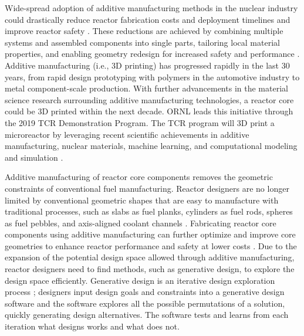 Wide-spread adoption of additive manufacturing methods in the nuclear industry 
could drastically reduce reactor fabrication costs and deployment timelines 
and improve reactor safety \cite{simpson_considerations_2019}. 
These reductions are achieved by combining multiple systems and assembled 
components into single parts, tailoring local material properties, and 
enabling geometry redesign for increased safety and performance 
\cite{simpson_considerations_2019}. 
Additive manufacturing (i.e., 3D printing) has progressed rapidly in the last 
30 years, from rapid design prototyping with polymers in the automotive industry 
to metal component-scale production. 
With further advancements in the material science research surrounding 
additive manufacturing technologies, a reactor core could be 3D printed within the 
next decade. 
\gls{ORNL} leads this initiative through the 2019 \gls{TCR} Demonstration Program. 
The \gls{TCR} program will 3D print a microreactor by leveraging recent scientific 
achievements in additive manufacturing, nuclear materials, machine learning, and 
computational modeling and simulation \cite{terrani_transformational_2019}.

Additive manufacturing of reactor core components removes the geometric constraints 
of conventional fuel manufacturing. 
Reactor designers are no longer limited by conventional geometric shapes that are easy 
to manufacture with traditional processes, such as slabs as fuel planks, cylinders as 
fuel rods, spheres as fuel pebbles, and axis-aligned coolant channels 
\cite{sobes_artificial_2020}. 
Fabricating reactor core components using additive manufacturing can further optimize 
and improve core geometries to enhance reactor performance and safety at lower costs 
\cite{bergeron_early_2018}.
Due to the expansion of the potential design space allowed through additive 
manufacturing, reactor designers need to find methods, such as generative 
design, to explore the design space efficiently. 
Generative design is an iterative design exploration process 
\cite{autodesk_autodesk_2020}; designers input design goals and constraints into a 
generative design software and the software explores all the possible permutations 
of a solution, quickly generating design alternatives. 
The software tests and learns from each iteration what designs works and what does not. 

